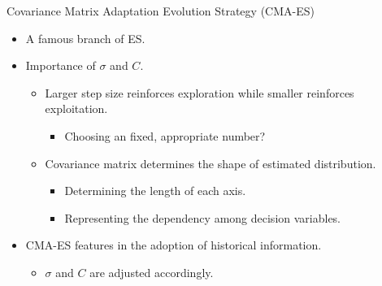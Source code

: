 \begin{frame}{Covariance Matrix Adaptation Evolution Strategy (CMA-ES)}
  \begin{itemize}
    \item A famous branch of ES.
      \vspace*{14pt}
    \item Importance of $\sigma$ and $C$.
      \begin{itemize}
        \item Larger step size reinforces exploration while smaller
          reinforces exploitation.
          \begin{itemize}
            \item Choosing an fixed, appropriate number?
          \end{itemize}
        \item Covariance matrix determines the shape of estimated
          distribution.
          \begin{itemize}
            \item Determining the length of each axis.
            \item Representing the dependency among decision variables.
          \end{itemize}
      \end{itemize}
      \vspace*{14pt}
    \item CMA-ES features in the adoption of historical information.
      \begin{itemize}
        \item $\sigma$ and $C$ are adjusted accordingly.
      \end{itemize}
  \end{itemize}
\end{frame}

